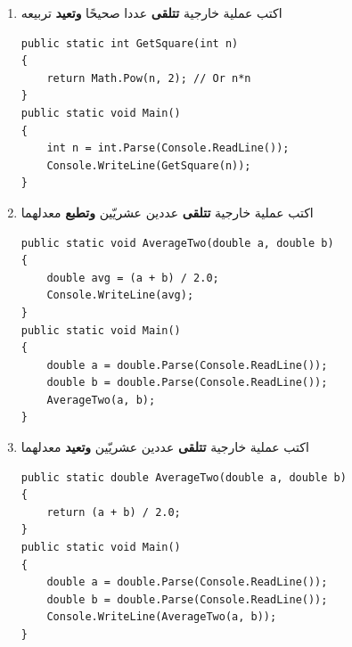 ﻿\documentclass[12pt]{article}
\begin{document}
\begin{enumerate}[itemsep=3em]
\begin{enumerate}
\item اكتب عملية خارجية \textbf{تتلقى} عددا صحيحًا \textbf{وتعيد} تربيعه
\ifwithsols
\begin{boxSolution}
\begin{english}
\begin{verbatim}
public static int GetSquare(int n)
{
    return Math.Pow(n, 2); // Or n*n
}
public static void Main()
{
    int n = int.Parse(Console.ReadLine());
    Console.WriteLine(GetSquare(n));
}
\end{verbatim}
\end{english}
\end{boxSolution}
\fi

\item اكتب عملية خارجية \textbf{تتلقى} عددين عشريّين \textbf{وتطبع} معدلهما
\ifwithsols
\begin{boxSolution}
\begin{english}
\begin{verbatim}
public static void AverageTwo(double a, double b)
{
    double avg = (a + b) / 2.0;
    Console.WriteLine(avg);
}
public static void Main()
{
    double a = double.Parse(Console.ReadLine());
    double b = double.Parse(Console.ReadLine());
    AverageTwo(a, b);
}
\end{verbatim}
\end{english}
\end{boxSolution}
\clearpage
\fi

\item اكتب عملية خارجية \textbf{تتلقى} عددين عشريّين \textbf{وتعيد} معدلهما
\ifwithsols
\begin{boxSolution}
\begin{english}
\begin{verbatim}
public static double AverageTwo(double a, double b)
{
    return (a + b) / 2.0;
}
public static void Main()
{
    double a = double.Parse(Console.ReadLine());
    double b = double.Parse(Console.ReadLine());
    Console.WriteLine(AverageTwo(a, b));
}
\end{verbatim}
\end{english}
\end{boxSolution}
\clearpage
\fi


\end{enumerate}
\end{enumerate}
\end{document}
